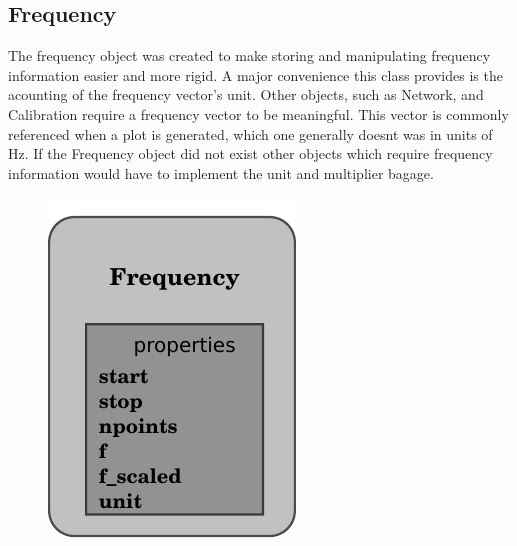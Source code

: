 \documentclass[letterpaper,10pt,english]{sphinxmanual}
\begin{document}
\subsection{Frequency}
\label{architecture:frequency}
The frequency object was created to make storing and manipulating frequency information easier and more rigid. A major convenience this class provides is the acounting of the frequency vector's unit. Other objects, such as Network, and Calibration require a frequency vector to be meaningful. This vector is commonly referenced when a plot is generated, which one generally doesnt was in units of Hz. If the Frequency object did not exist other objects which require frequency information would have to implement the unit and multiplier bagage.
\begin{figure}[htbp]
\centering

\includegraphics{frequency.pdf}
\end{figure}
\end{document}
